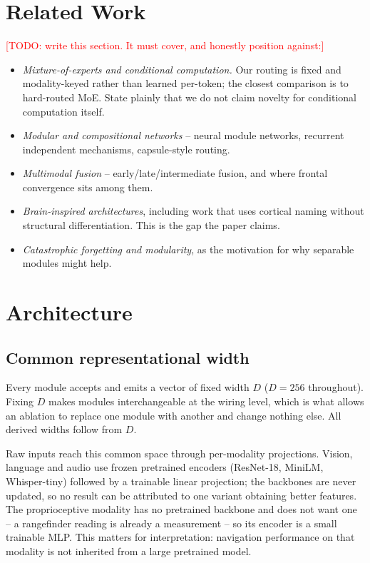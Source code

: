 \documentclass[conference]{IEEEtran}
\newcommand{\todo}[1]{\textcolor{red}{[TODO: #1]}}
\begin{document}
\section{Related Work}

\todo{write this section. It must cover, and honestly position against:}
\begin{itemize}
  \item \emph{Mixture-of-experts and conditional computation.} Our routing is
        fixed and modality-keyed rather than learned per-token; the closest
        comparison is to hard-routed MoE. State plainly that we do not claim
        novelty for conditional computation itself.
  \item \emph{Modular and compositional networks} -- neural module networks,
        recurrent independent mechanisms, capsule-style routing.
  \item \emph{Multimodal fusion} -- early/late/intermediate fusion, and where
        frontal convergence sits among them.
  \item \emph{Brain-inspired architectures}, including work that uses cortical
        naming without structural differentiation. This is the gap the paper
        claims.
  \item \emph{Catastrophic forgetting and modularity}, as the motivation for
        why separable modules might help.
\end{itemize}

\section{Architecture}
\label{sec:arch}

\subsection{Common representational width}

Every module accepts and emits a vector of fixed width $D$ ($D=256$
throughout). Fixing $D$ makes modules interchangeable at the wiring level,
which is what allows an ablation to replace one module with another and change
nothing else. All derived widths follow from $D$.

Raw inputs reach this common space through per-modality projections. Vision,
language and audio use frozen pretrained encoders (ResNet-18, MiniLM,
Whisper-tiny) followed by a trainable linear projection; the backbones are
never updated, so no result can be attributed to one variant obtaining better
features. The proprioceptive modality has no pretrained backbone and does not
want one -- a rangefinder reading is already a measurement -- so its encoder is
a small trainable MLP. This matters for interpretation: navigation performance
on that modality is not inherited from a large pretrained model.
\end{document}

